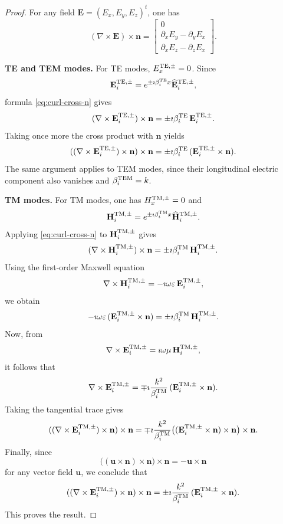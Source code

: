 \documentclass[smallextended]{svjour3}       %
\begin{document}
\begin{proof}
For any field $\mathbf E=(E_x,E_y,E_z)^t$, one has
\begin{equation}\label{eq:curl-cross-n}
(\nabla\times \mathbf E)\times \mathbf n
=
\begin{bmatrix}
0\\
\partial_x E_y-\partial_y E_x\\
\partial_x E_z-\partial_z E_x
\end{bmatrix}.
\end{equation}

\smallskip
\noindent\textbf{TE and TEM modes.}
For TE modes, $E_x^{\rm TE,\pm}=0$. Since
\[
\mathbf E^{\rm TE,\pm}_i
=
e^{\pm \imath \beta_i^{\rm TE}x}\widehat{\mathbf E}_i^{\rm TE,\pm},
\]
formula \eqref{eq:curl-cross-n} gives
\[
(\nabla\times \mathbf E_i^{\rm TE,\pm})\times \mathbf n
=
\pm \imath \beta_i^{\rm TE}\,\mathbf E_i^{\rm TE,\pm}.
\]
Taking once more the cross product with $\mathbf n$ yields
\[
((\nabla\times \mathbf E_i^{\rm TE,\pm})\times \mathbf n)\times \mathbf n
=
\pm \imath \beta_i^{\rm TE}\,(\mathbf E_i^{\rm TE,\pm}\times \mathbf n).
\]
The same argument applies to TEM modes, since their longitudinal electric component also vanishes and $\beta_i^{\rm TEM}=k$.

\smallskip
\noindent\textbf{TM modes.}
For TM modes, one has $H_x^{\rm TM,\pm}=0$ and
\[
\mathbf H_i^{\rm TM,\pm}
=
e^{\pm \imath \beta_i^{\rm TM}x}\widehat{\mathbf H}_i^{\rm TM,\pm}.
\]
Applying \eqref{eq:curl-cross-n} to $\mathbf H_i^{\rm TM,\pm}$ gives
\[
(\nabla\times \mathbf H_i^{\rm TM,\pm})\times \mathbf n
=
\pm \imath \beta_i^{\rm TM}\,\mathbf H_i^{\rm TM,\pm}.
\]
Using the first-order Maxwell equation
\[
\nabla\times \mathbf H_i^{\rm TM,\pm}
=
-\imath \omega\varepsilon\,\mathbf E_i^{\rm TM,\pm},
\]
we obtain
\[
-\imath \omega\varepsilon\,(\mathbf E_i^{\rm TM,\pm}\times \mathbf n)
=
\pm \imath \beta_i^{\rm TM}\,\mathbf H_i^{\rm TM,\pm}.
\]
Now, from
\[
\nabla\times \mathbf E_i^{\rm TM,\pm}
=
\imath \omega\mu\,\mathbf H_i^{\rm TM,\pm},
\]
it follows that
\[
\nabla\times \mathbf E_i^{\rm TM,\pm}
=
\mp \imath \frac{k^2}{\beta_i^{\rm TM}}\,
(\mathbf E_i^{\rm TM,\pm}\times \mathbf n).
\]
Taking the tangential trace gives
\[
((\nabla\times \mathbf E_i^{\rm TM,\pm})\times \mathbf n)\times \mathbf n
=
\mp \imath \frac{k^2}{\beta_i^{\rm TM}}
\bigl((\mathbf E_i^{\rm TM,\pm}\times \mathbf n)\times \mathbf n\bigr)\times \mathbf n.
\]
Finally, since
\[
\bigl((\mathbf u\times \mathbf n)\times \mathbf n\bigr)\times \mathbf n
=
-\mathbf u\times \mathbf n
\]
for any vector field $\mathbf u$, we conclude that
\[
((\nabla\times \mathbf E_i^{\rm TM,\pm})\times \mathbf n)\times \mathbf n
=
\pm \imath \frac{k^2}{\beta_i^{\rm TM}}\,
(\mathbf E_i^{\rm TM,\pm}\times \mathbf n).
\]
This proves the result.
\end{proof}
\end{document}
